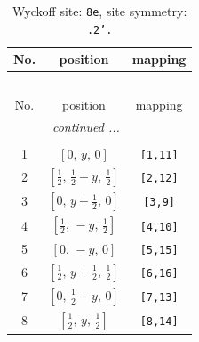 \documentclass[fleqn,8pt]{jsarticle}
\begin{document}
\renewcommand{\arraystretch}{1.2}
\begin{longtable}{ccc}
\caption{Wyckoff site: {\tt 8e}, site symmetry: {\tt .2'.}}
 \\
 \hline \hline
No. & position & mapping \\ \hline \endfirsthead

\multicolumn{2}{l}{\tablename\ \thetable{}} \\
 \hline \hline
No. & position & mapping \\ \hline \endhead

 \hline \hline
\multicolumn{2}{r}{\footnotesize\it continued ...} \\ \endfoot

 \hline \hline
\multicolumn{2}{r}{} \\ \endlastfoot

1 & $\left[ 0,\, y,\, 0 \right]$ & {\tt [1,11]} \\ \hline
2 & $\left[ \frac{1}{2},\, \frac{1}{2} - y,\, \frac{1}{2} \right]$ & {\tt [2,12]} \\ \hline
3 & $\left[ 0,\, y + \frac{1}{2},\, 0 \right]$ & {\tt [3,9]} \\ \hline
4 & $\left[ \frac{1}{2},\, - y,\, \frac{1}{2} \right]$ & {\tt [4,10]} \\ \hline
5 & $\left[ 0,\, - y,\, 0 \right]$ & {\tt [5,15]} \\ \hline
6 & $\left[ \frac{1}{2},\, y + \frac{1}{2},\, \frac{1}{2} \right]$ & {\tt [6,16]} \\ \hline
7 & $\left[ 0,\, \frac{1}{2} - y,\, 0 \right]$ & {\tt [7,13]} \\ \hline
8 & $\left[ \frac{1}{2},\, y,\, \frac{1}{2} \right]$ & {\tt [8,14]} \\
\end{longtable}
\renewcommand{\arraystretch}{1.2}
\end{document}
